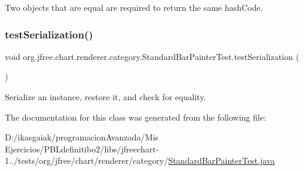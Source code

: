 Two objects that are equal are required to return the same hash\+Code. \mbox{\label{classorg_1_1jfree_1_1chart_1_1renderer_1_1category_1_1_standard_bar_painter_test_a9515cf263ea33ca763f0bb497d8c784a}} 
\subsubsection{\texorpdfstring{test\+Serialization()}{testSerialization()}}
{\footnotesize\ttfamily void org.\+jfree.\+chart.\+renderer.\+category.\+Standard\+Bar\+Painter\+Test.\+test\+Serialization (\begin{DoxyParamCaption}{ }\end{DoxyParamCaption})}

Serialize an instance, restore it, and check for equality. 

The documentation for this class was generated from the following file\+:\begin{DoxyCompactItemize}
\item 
D\+:/ikasgaiak/programacion\+Avanzada/\+Mis Ejercicios/\+P\+B\+Ldefinitibo2/libs/jfreechart-\/1../tests/org/jfree/chart/renderer/category/\mbox{\hyperlink{_standard_bar_painter_test_8java}{Standard\+Bar\+Painter\+Test.\+java}}\end{DoxyCompactItemize}
